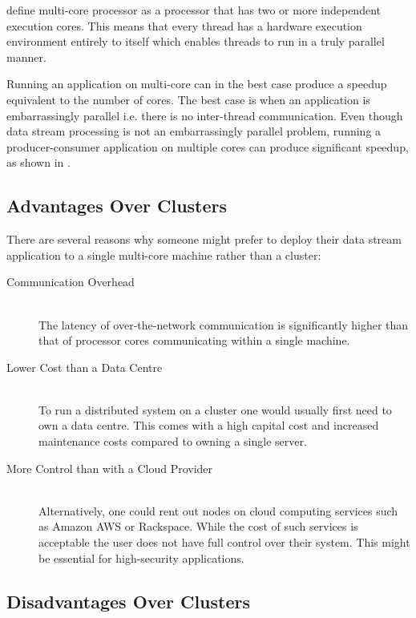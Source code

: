 \documentclass[bsc,deptreport,twoside,singlespacing,normalheadings,parskip]{infthesis}\usepackage[]{graphicx}\usepackage[]{color}
\begin{document}
\textcite{akhter2006multi} define multi-core processor as a processor that has two or more independent execution cores. This means that every thread has a hardware execution environment entirely to itself which enables threads to run in a truly parallel manner.

Running an application on multi-core can in the best case produce a speedup equivalent to the number of cores. The best case is when an application is embarrassingly parallel i.e. there is no inter-thread communication. Even though data stream processing is not an embarrassingly parallel problem, running a producer-consumer application on multiple cores can produce significant speedup, as shown in \citep{Prat-Perez:2013:PPM:2450027.2450037}.

\subsection{Advantages Over Clusters}
\label{subsec:advantages}

There are several reasons why someone might prefer to deploy their data stream application to a single multi-core machine rather than a cluster:

\begin{description}
	\item[Communication Overhead] \hfill \\
	The latency of over-the-network communication is significantly higher than that of processor cores communicating within a single machine.
	\item[Lower Cost than a Data Centre] \hfill \\
	To run a distributed system on a cluster one would usually first need to own a data centre. This comes with a high capital cost and increased maintenance costs compared to owning a single server.
	\item[More Control than with a Cloud Provider] \hfill \\
	Alternatively, one could rent out nodes on cloud computing services such as Amazon AWS or Rackspace. While the cost of such services is acceptable the user does not have full control over their system. This might be essential for high-security applications.
\end{description}

\subsection{Disadvantages Over Clusters}
\label{subsec:disadvantages}
\end{document}
